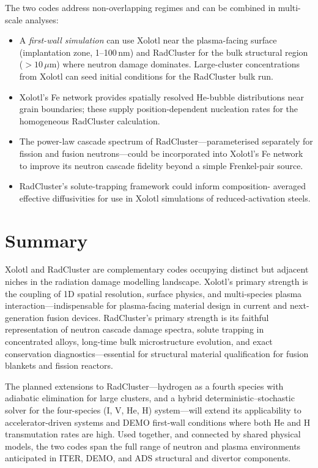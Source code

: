 \documentclass[12pt,letterpaper]{article}
\begin{document}
The two codes address non-overlapping regimes and can be combined
in multi-scale analyses:
\begin{itemize}
  \item A \emph{first-wall simulation} can use Xolotl near the
    plasma-facing surface (implantation zone, 1--100\,nm) and
    RadCluster for the bulk structural region ($> 10\,\mu$m) where
    neutron damage dominates.  Large-cluster concentrations from
    Xolotl can seed initial conditions for the RadCluster bulk run.

  \item Xolotl's Fe network provides spatially resolved He-bubble
    distributions near grain boundaries; these supply position-dependent
    nucleation rates for the homogeneous RadCluster calculation.

  \item The power-law cascade spectrum of RadCluster---parameterised
    separately for fission and fusion neutrons---could be incorporated
    into Xolotl's Fe network to improve its neutron cascade fidelity
    beyond a simple Frenkel-pair source.

  \item RadCluster's solute-trapping framework could inform composition-
    averaged effective diffusivities for use in Xolotl simulations of
    reduced-activation steels.
\end{itemize}

\section{Summary}

Xolotl and RadCluster are complementary codes occupying distinct but
adjacent niches in the radiation damage modelling landscape.
Xolotl's primary strength is the coupling of 1D spatial resolution,
surface physics, and multi-species plasma interaction---indispensable
for plasma-facing material design in current and next-generation fusion
devices.  RadCluster's primary strength is its faithful representation of
neutron cascade damage spectra, solute trapping in concentrated alloys,
long-time bulk microstructure evolution, and exact conservation
diagnostics---essential for structural material qualification for fusion
blankets and fission reactors.

The planned extensions to RadCluster---hydrogen as a fourth species with
adiabatic elimination for large clusters, and a hybrid
deterministic--stochastic solver for the four-species (I, V, He, H)
system---will extend its applicability to accelerator-driven systems and
DEMO first-wall conditions where both He and H transmutation rates are
high.  Used together, and connected by shared physical models, the two
codes span the full range of neutron and plasma environments anticipated
in ITER, DEMO, and ADS structural and divertor components.
\end{document}
